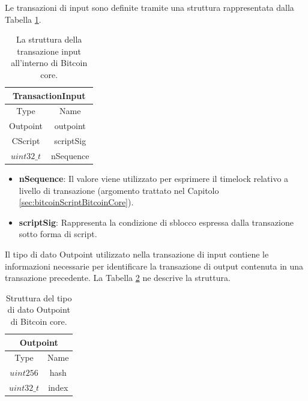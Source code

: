 Le transazioni di input sono definite tramite una struttura rappresentata dalla Tabella \ref{tab:inputtxbitcoinc}.

\begin{table}
       \centering\small
           \begin{tabular}{|c|c|}
               \hline
                 \multicolumn{2}{|c|}{\textbf{TransactionInput}} \\
                \hline \hline
                 \multicolumn{1}{|c|}{Type} & \multicolumn{1}{c|}{Name} \\
               \hline
               Outpoint & outpoint   \\
               \hline
               CScript & scriptSig \\
               \hline
               $uint32\_t$ & nSequence \\
               \hline
       \end{tabular}
       \caption{La struttura della transazione input all’interno di Bitcoin core.\label{tab:inputtxbitcoinc}}
   \end{table}

\begin{itemize}
  \item {\bf nSequence\/}:  Il valore viene utilizzato per esprimere il timelock relativo a livello di transazione (argomento trattato nel Capitolo \ref{sec:bitcoinScriptBitcoinCore}).
  \item {\bf scriptSig\/}: Rappresenta la condizione di sblocco espressa dalla transazione sotto forma di script.
\end{itemize}

Il tipo di dato Outpoint utilizzato nella transazione di input contiene le informazioni necessarie per identificare la transazione di output contenuta in una transazione precedente. La Tabella \ref{tab:outpointbitcoinc} ne descrive la struttura.


\begin{table}
       \centering\small
           \begin{tabular}{|c|c|}
               \hline
                 \multicolumn{2}{|c|}{\textbf{Outpoint}} \\
                \hline \hline
                 \multicolumn{1}{|c|}{Type} & \multicolumn{1}{c|}{Name} \\
               \hline
               $uint256$ & hash   \\
               \hline
               $uint32\_t$ & index \\
              \hline
       \end{tabular}
       \caption{Struttura del tipo di dato Outpoint di Bitcoin core.\label{tab:outpointbitcoinc}}
   \end{table}

